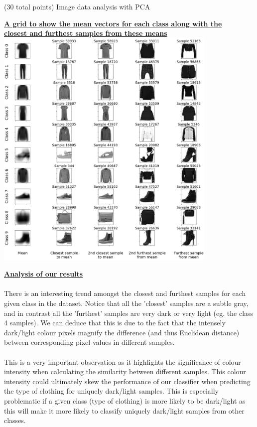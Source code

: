 \documentclass[12pt]{article}
\begin{document}
\begin{question}{(30 total points) Image data analysis with PCA}
\begin{subquestion}
  \begin{answerbox}{50.75em}
    \begin{center}
    \textbf{\underline{A grid to show the mean vectors for each class along with the}}\\
    \textbf{\underline{closest and furthest samples from these means}}
    \vspace{0.2cm}\\
    \includegraphics[width=0.8\textwidth]{images/q12.png}
    \end{center}
    \footnotesize{\textbf{\underline{Analysis of our results}}}\\
\\
    \scriptsize{
    There is an interesting trend amongst the closest and furthest samples for each given class in the dataset. Notice that all the 'closest' samples are a subtle gray, and in contrast all the 'furthest' samples are very dark or very light (eg. the class 4 samples). We can deduce that this is due to the fact that the intensely dark/light colour pixels magnify the difference (and thus Euclidean distance) between corresponding pixel values in different samples.\\
\\
    This is a very important observation as it highlights the significance of colour intensity when calculating the similarity between different samples. This colour intensity could ultimately skew the performance of our classifier when predicting the type of clothing for uniquely dark/light samples. This is especially problematic if a given class (type of clothing) is more likely to be dark/light as this will make it more likely to classify uniquely dark/light samples from other classes.\\
}
\end{answerbox}
\end{subquestion}
\end{question}
\end{document}
